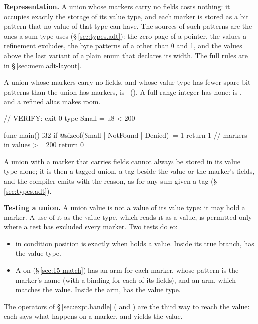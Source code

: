 \pnum
\textbf{Representation.}  A union whose markers carry no fields costs nothing: it occupies
exactly the storage of its value type, and each marker is stored as a bit pattern that no value
of that type can have.  The sources of such patterns are the ones a sum type uses
(\S\,\ref{sec:types.adt}): the zero page of a pointer, the values a refinement excludes, the
byte patterns of a  other than 0 and 1, and the values above the last variant of a
plain enum that declares its width.  The full rules are in \S\,\ref{sec:mem.adt-layout}.

\begin{constraint}
  A union whose markers carry no fields, and whose value type has fewer spare bit patterns than
  the union has markers, is \illformed{}~().  A full-range integer has none:
   is \illformed{}, and a refined alias makes room.
\end{constraint}

\begin{laincode}
// VERIFY: exit 0
type Small = u8 < 200

func main() i32 {
    if @sizeof(Small | NotFound | Denied) != 1 { return 1 }   // markers in values >= 200
    return 0
}
\end{laincode}

\pnum
A union with a marker that carries fields cannot always be stored in its value type alone; it
is then a tagged union, a tag beside the value or the marker's fields, and the compiler emits
 with the reason, as for any sum given a tag (\S\,\ref{sec:types.adt}).

\pnum
\textbf{Testing a union.}  A union value is not a value of its value type: it may hold a marker.
A use of it as the value type, which reads it as a value, is permitted only where a test has
excluded every marker.  Two tests do so:
\begin{itemize}
  \item {} in condition position is  exactly when  holds a value.
        Inside its true branch,  has the value type.
  \item A  on  (\S\,\ref{sec:15-match}) has an arm for each marker, whose
        pattern is the marker's name (with a binding for each of its fields), and an
         arm, which matches the value.  Inside the  arm,  has
        the value type.
\end{itemize}
The operators of \S\,\ref{sec:expr.handle} ( and ) are the third way to
reach the value: each says what happens on a marker, and yields the value.

